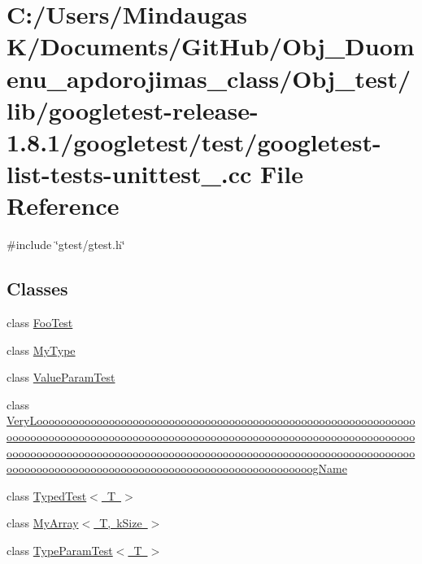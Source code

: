 \hypertarget{_obj__test_2lib_2googletest-release-1_88_81_2googletest_2test_2googletest-list-tests-unittest___8cc}{}\section{C\+:/\+Users/\+Mindaugas K/\+Documents/\+Git\+Hub/\+Obj\+\_\+\+Duomenu\+\_\+apdorojimas\+\_\+class/\+Obj\+\_\+test/lib/googletest-\/release-\/1.8.1/googletest/test/googletest-\/list-\/tests-\/unittest\+\_\+.cc File Reference}
\label{_obj__test_2lib_2googletest-release-1_88_81_2googletest_2test_2googletest-list-tests-unittest___8cc}
{\ttfamily \#include \char`\"{}gtest/gtest.\+h\char`\"{}}\newline
\subsection*{Classes}
\begin{DoxyCompactItemize}
\item 
class \mbox{\hyperlink{class_foo_test}{Foo\+Test}}
\item 
class \mbox{\hyperlink{class_my_type}{My\+Type}}
\item 
class \mbox{\hyperlink{class_value_param_test}{Value\+Param\+Test}}
\item 
class \mbox{\hyperlink{class_very_loooooooooooooooooooooooooooooooooooooooooooooooooooooooooooooooooooooooooooooooooooo570db76e21fa868abfe0f6323a68c9ba}{Very\+Loooooooooooooooooooooooooooooooooooooooooooooooooooooooooooooooooooooooooooooooooooooooooooooooooooooooooooooooooooooooooooooooooooooooooooooooooooooooooooooooooooooooooooooooooooooooooooooooooooooooooooooooooooooooooooooooooooooooooooooooooooooooooog\+Name}}
\item 
class \mbox{\hyperlink{class_typed_test}{Typed\+Test$<$ T $>$}}
\item 
class \mbox{\hyperlink{class_my_array}{My\+Array$<$ T, k\+Size $>$}}
\item 
class \mbox{\hyperlink{class_type_param_test}{Type\+Param\+Test$<$ T $>$}}
\end{DoxyCompactItemize}
